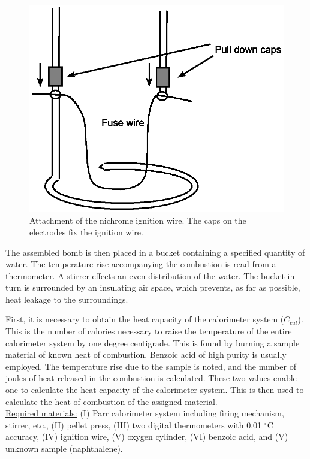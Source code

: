 \documentclass[byrevtex,amssymb,aps,pra,floatfix,letterpaper]{revtex4}
\newcommand{\degree}[0]{$^\circ$}
\begin{document}
\begin{figure}[!htp]
\begin{center}
\includegraphics[scale=0.5]{wire}
\caption{Attachment of the nichrome ignition wire. The caps on the electrodes fix the ignition wire.}
\label{fig2}
\end{center}
\end{figure}

The assembled bomb is then placed in a bucket containing a specified quantity of water. The temperature rise accompanying the combustion is read from a thermometer. A stirrer effects an even distribution of the water. The bucket in turn is surrounded by an insulating air space, which prevents, as far as possible, heat leakage to the surroundings.

First, it is necessary to obtain the heat capacity of the calorimeter system ($C_{cal}$). This is the number of calories necessary to raise the temperature of the entire calorimeter system by one degree centigrade. This is found by burning a sample material of known heat of combustion. Benzoic acid of high purity is usually employed. The temperature rise due to the sample is noted, and the number of joules of heat released in the combustion is calculated. These two values enable one to calculate the heat capacity of the calorimeter system. This is then used to calculate the heat of combustion of the assigned material.\\

\noindent
\underline{Required materials:} (I) Parr calorimeter system including firing mechanism, stirrer, etc., (II) pellet press, (III) two digital thermometers with 0.01 \degree C accuracy, (IV) ignition wire, (V) oxygen cylinder, (VI) benzoic acid, and (V) unknown sample (naphthalene).
\end{document}
